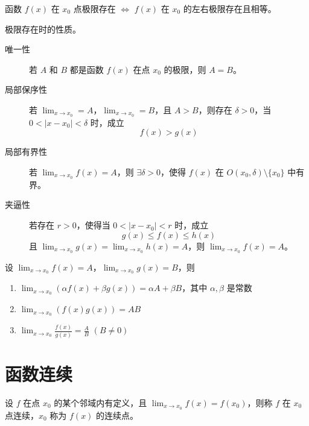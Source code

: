 \documentclass{ctexbook}
\begin{document}
\begin{theorem}[左右极限相等]
    函数 $f(x)$ 在 $x_0$ 点极限存在 $\Leftrightarrow$ $f(x)$ 在 $x_0$ 的左右极限存在且相等。
\end{theorem}

\begin{proposition}[函数极限性质]
    极限存在时的性质。
    \begin{description}
        \item[唯一性] 若 $A$ 和 $B$ 都是函数 $f(x)$ 在点 $x_0$ 的极限，则 $A=B$。
        \item[局部保序性] 若 $\lim_{x\rightarrow x_0}=A$，$\lim_{x\rightarrow x_0}=B$，且 $A>B$，则存在 $\delta>0$，当 $0<\lvert x-x_0\rvert<\delta$ 时，成立
        \begin{equation}
            f(x)>g(x)
        \end{equation}
        \item[局部有界性] 若 $\lim_{x\rightarrow x_0} f(x)=A$，则 $\exists\delta>0$，使得 $f(x)$ 在 $O(x_0,\delta)\setminus \{x_0\}$ 中有界。
        \item[夹逼性] 若存在 $r>0$，使得当 $0<\lvert x-x_0\rvert<r$ 时，成立
        \begin{equation}
            g(x)\leq f(x)\leq h(x)
        \end{equation}
        且 $\lim_{x\rightarrow x_0}g(x)=\lim_{x\rightarrow x_0}h(x)=A$，则 $\lim_{x\rightarrow x_0}f(x)=A$。
    \end{description}
\end{proposition}

\begin{theorem}[函数极限四则运算]
    设 $\lim_{x\rightarrow x_0}f(x)=A$，$\lim_{x\rightarrow x_0}g(x)=B$，则
    \begin{enumerate}
        \item $\lim_{x\rightarrow x_0}(\alpha f(x)+\beta g(x))=\alpha A + \beta B$，其中 $\alpha,\beta$ 是常数
        \item $\lim_{x\rightarrow x_0}(f(x)g(x))=AB$
        \item $\lim_{x\rightarrow x_0}\frac{f(x)}{g(x)}=\frac{A}{B}$ $(B\neq 0)$
    \end{enumerate}
\end{theorem}

\section{函数连续}

\begin{definition}[函数连续]
    设 $f$ 在点 $x_0$ 的某个邻域内有定义，且 $\lim_{x\rightarrow x_0}f(x)=f(x_0)$，则称 $f$ 在 $x_0$ 点连续，$x_0$ 称为 $f(x)$ 的连续点。
\end{definition}
\end{document}
